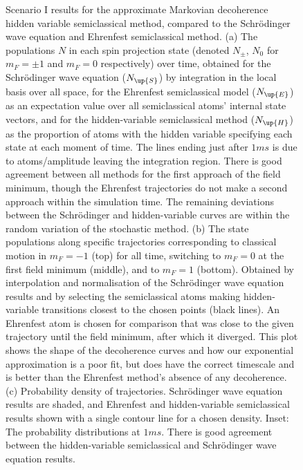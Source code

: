{\begin{figure}
    \caption{Scenario I results for the approximate Markovian decoherence hidden variable semiclassical method, compared to the Schr\"odinger wave equation and Ehrenfest semiclassical method. (a) The populations $N$ in each spin projection state (denoted $N_\pm$, $N_0$ for $m_F=\pm 1$ and $m_F=0$ respectively) over time, obtained for the Schr\"odinger wave equation ($N_\up{S}$) by integration in the local basis over all space, for the Ehrenfest semiclassical model ($N_\up{E}$) as an expectation value over all semiclassical atoms' internal state vectors, and for the hidden-variable semiclassical method ($N_\up{H}$) as the proportion of atoms with the hidden variable specifying each state at each moment of time. The lines ending just after $1\unit{ms}$ is due to atoms/amplitude leaving the integration region. There is good agreement between all methods for the first approach of the field minimum, though the Ehrenfest trajectories do not make a second approach within the simulation time. The remaining deviations between the Schr\"odinger and hidden-variable curves are within the random variation of the stochastic method. (b) The state populations along specific trajectories corresponding to classical motion in $m_F=-1$ (top) for all time, switching to $m_F=0$ at the first field minimum (middle), and to $m_F=1$ (bottom). Obtained by interpolation and normalisation of the Schr\"odinger wave equation results and by selecting the semiclassical atoms making hidden-variable transitions closest to the chosen points (black lines). An Ehrenfest atom is chosen for comparison that was close to the given trajectory until the field minimum, after which it diverged. This plot shows the shape of the decoherence curves and how our exponential approximation is a poor fit, but does have the correct timescale and is better than the Ehrenfest method's absence of any decoherence. (c) Probability density of trajectories. Schr\"odinger wave equation results are shaded, and Ehrenfest and hidden-variable semiclassical results shown with a single contour line for a chosen density. Inset: The probability distributions at $1\unit{ms}$. There is good agreement between the hidden-variable semiclassical and Schr\"odinger wave equation results.}\label{fig:scenario_one_markovian}
\end{figure}
\restoregeometry}

